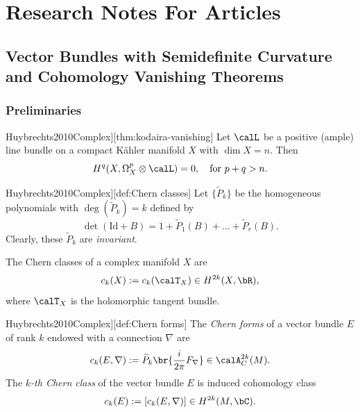 \documentclass[lang=en,12pt]{beautybook}
\begin{document}
\thispagestyle{empty}
\tableofcontents\let\cleardoublepage\clearpage


\mainmatter
{}

\part{Research Notes For Articles}


\chapter{Vector Bundles with Semidefinite Curvature and Cohomology Vanishing Theorems}

\section{Preliminaries}

\begin{theorem}[][Kodaira vanishing theorem\cite[P196]{Huybrechts2010Complex}][thm:kodaira-vanishing]
  Let $\calL$ be a positive (ample) line bundle on a compact K\"ahler manifold $X$ with $\dim X=n$. Then
  \begin{equation}
    H^q (X,\Omega_X^p \otimes \calL)=0,\quad \text{for  }p+q>n.
  \end{equation}
\end{theorem}

\begin{definition}[][Chern classes\cite[P196]{Huybrechts2010Complex}][def:Chern classes]
  Let $\{\widetilde{P}_k\}$ be the homogeneous polynomials with $\deg (\widetilde{P}_k)=k$ defined by
  \[\det(\textrm{Id}+B)=1+\widetilde{P}_1(B)+\ldots+\widetilde{P}_r(B).\]
  Clearly, these $\widetilde{P}_k$ are \textit{invariant}.

  The Chern classes of a complex manifold $X$ are \[c_k(X):=c_k(\calT_X)\in H^{2k}(X,\bR),\]
  where $\calT_X$ is the holomorphic tangent bundle.
\end{definition}
\begin{definition}[][Chern forms\cite[P196]{Huybrechts2010Complex}][def:Chern forms]
  The \textit{Chern forms} of a vector bundle $E$ of rank $k$ endowed with a connection $\nabla$ are \[c_k(E,\nabla):=\widetilde{P}_k\br{\frac{i}{2\pi}F_\nabla}\in\calA_C^{2k}(M).\]
  The \textit{$k$-th Chern class} of the vector bundle $E$ is induced cohomology class \[c_k(E):=[c_k(E,\nabla)]\in H^{2k}(M,\bC).\]
\end{definition}
\end{document}
